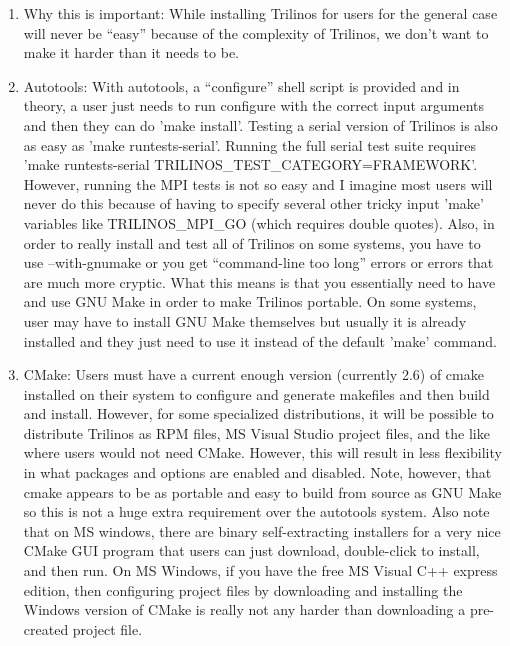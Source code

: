 \documentclass[pdf,ps2pdf,11pt]{SANDreport}
\begin{document}
\begin{enumerate}
  \begin{enumerate}

  {}\item Why this is important: While installing Trilinos for users
  for the general case will never be ``easy'' because of the
  complexity of Trilinos, we don't want to make it harder than it
  needs to be.

  {}\item Autotools: With autotools, a ``configure'' shell script is
  provided and in theory, a user just needs to run configure with the
  correct input arguments and then they can do 'make install'.
  Testing a serial version of Trilinos is also as easy as 'make
  runtests-serial'.  Running the full serial test suite requires 'make
  runtests-serial TRILINOS\_TEST\_CATEGORY=FRAMEWORK'.  However,
  running the MPI tests is not so easy and I imagine most users will
  never do this because of having to specify several other tricky
  input 'make' variables like TRILINOS\_MPI\_GO (which requires double
  quotes).  Also, in order to really install and test all of Trilinos
  on some systems, you have to use --with-gnumake or you get
  ``command-line too long'' errors or errors that are much more
  cryptic.  What this means is that you essentially need to have and
  use GNU Make in order to make Trilinos portable.  On some systems,
  user may have to install GNU Make themselves but usually it is
  already installed and they just need to use it instead of the
  default 'make' command.

  {}\item CMake: Users must have a current enough version (currently
  2.6) of cmake installed on their system to configure and generate
  makefiles and then build and install.  However, for some specialized
  distributions, it will be possible to distribute Trilinos as RPM
  files, MS Visual Studio project files, and the like where users
  would not need CMake.  However, this will result in less flexibility
  in what packages and options are enabled and disabled.  Note,
  however, that cmake appears to be as portable and easy to build from
  source as GNU Make so this is not a huge extra requirement over the
  autotools system.  Also note that on MS windows, there are binary
  self-extracting installers for a very nice CMake GUI program that
  users can just download, double-click to install, and then run.  On
  MS Windows, if you have the free MS Visual C++ express edition, then
  configuring project files by downloading and installing the Windows
  version of CMake is really not any harder than downloading a
  pre-created project file.


\end{enumerate}
\end{enumerate}
\end{document}
